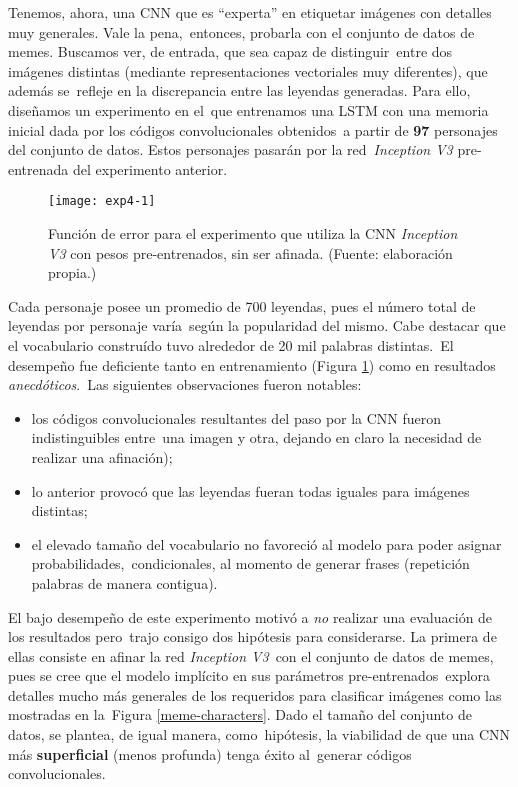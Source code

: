 Tenemos, ahora, una CNN que es ``experta'' en etiquetar imágenes con detalles muy generales. Vale la pena,\
entonces, probarla con el conjunto de datos de memes. Buscamos ver, de entrada, que sea capaz de distinguir\
entre dos imágenes distintas (mediante representaciones vectoriales muy diferentes), que además se\
refleje en la discrepancia entre las leyendas generadas. Para ello, diseñamos un experimento en el\
que entrenamos una LSTM con una memoria inicial dada por los códigos convolucionales obtenidos\
a partir de \textbf{97} personajes del conjunto de datos. Estos personajes pasarán por la red\
\emph{Inception V3} pre-entrenada del experimento anterior.

\begin{figure}[h]
  \texttt{[image: exp4-1]}
  \caption{
    Función de error para el experimento que utiliza la CNN \emph{Inception V3}
    con pesos pre-entrenados, sin ser afinada.
    (Fuente: elaboración propia.)
  }
  \label{exp4}
\end{figure}

Cada personaje posee un promedio de 700 leyendas, pues el número total de leyendas por personaje varía\
según la popularidad del mismo. Cabe destacar que el vocabulario construído tuvo alrededor de 20 mil palabras distintas.\
El desempeño fue deficiente tanto en entrenamiento (Figura \ref{exp4}) como en resultados \emph{anecdóticos}.\
Las siguientes observaciones fueron notables:
\begin{itemize}
\item los códigos convolucionales resultantes del paso por la CNN fueron indistinguibles entre\
  una imagen y otra, dejando en claro la necesidad de realizar una afinación);
\item lo anterior provocó que las leyendas fueran todas iguales para imágenes distintas;
\item el elevado tamaño del vocabulario no favoreció al modelo para poder asignar probabilidades,\
  condicionales, al momento de generar frases (repetición palabras de manera contigua).
\end{itemize}\par
El bajo desempeño de este experimento motivó a \emph{no} realizar una evaluación de los resultados pero\
trajo consigo dos hipótesis para considerarse. La primera de ellas consiste en afinar la red \emph{Inception V3}\
con el conjunto de datos de memes, pues se cree que el modelo implícito en sus parámetros pre-entrenados\
explora detalles mucho más generales de los requeridos para clasificar imágenes como las mostradas en la\
Figura \ref{meme-characters}. Dado el tamaño del conjunto de datos, se plantea, de igual manera, como\
hipótesis, la viabilidad de que una CNN más \textbf{superficial} (menos profunda) tenga éxito al\
generar códigos convolucionales.

